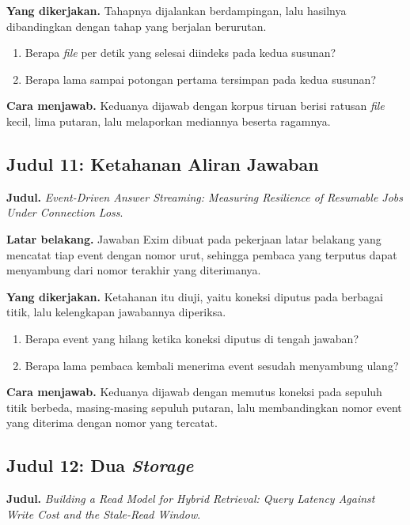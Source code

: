 \textbf{Yang dikerjakan.} Tahapnya dijalankan berdampingan, lalu hasilnya
dibandingkan dengan tahap yang berjalan berurutan.

\begin{enumerate}
  \item Berapa \textit{file} per detik yang selesai diindeks pada kedua susunan?
  \item Berapa lama sampai potongan pertama tersimpan pada kedua susunan?
\end{enumerate}

\textbf{Cara menjawab.} Keduanya dijawab dengan korpus tiruan berisi ratusan
\textit{file} kecil, lima putaran, lalu melaporkan mediannya beserta ragamnya.

\subsection*{Judul 11: Ketahanan Aliran Jawaban}

\textbf{Judul.} \textit{Event-Driven Answer Streaming: Measuring Resilience of Resumable Jobs Under Connection Loss}.

\textbf{Latar belakang.} Jawaban Exim dibuat pada pekerjaan latar belakang
yang mencatat tiap event dengan nomor urut, sehingga pembaca yang terputus
dapat menyambung dari nomor terakhir yang diterimanya.

\textbf{Yang dikerjakan.} Ketahanan itu diuji, yaitu koneksi diputus pada
berbagai titik, lalu kelengkapan jawabannya diperiksa.

\begin{enumerate}
  \item Berapa event yang hilang ketika koneksi diputus di tengah jawaban?
  \item Berapa lama pembaca kembali menerima event sesudah menyambung
    ulang?
\end{enumerate}

\textbf{Cara menjawab.} Keduanya dijawab dengan memutus koneksi pada sepuluh
titik berbeda, masing-masing sepuluh putaran, lalu membandingkan nomor
event yang diterima dengan nomor yang tercatat.

\subsection*{Judul 12: Dua \textit{Storage}}

\textbf{Judul.} \textit{Building a Read Model for Hybrid Retrieval: Query
Latency Against Write Cost and the Stale-Read Window}.


